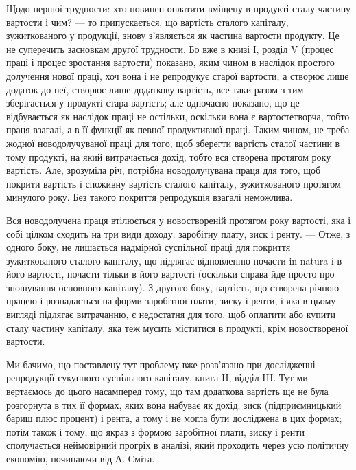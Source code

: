 
Щодо першої трудности: хто повинен оплатити вміщену в продукті сталу
частину вартости і чим? — то припускається, що вартість сталого капіталу, зужиткованого у продукції,
знову з’являється як частина вартости продукту. Це не
суперечить засновкам другої трудности. Бо вже в книзі І, розділ  V (процес праці і
процес зростання вартости) показано, яким чином в наслідок простого долучення
нової праці, хоч вона і не репродукує старої вартости, а створює лише додаток
до неї, створює лише додаткову вартість, все таки разом з тим зберігається
у продукті стара вартість; але одночасно показано, що це відбувається як наслідок
праці не остільки, оскільки вона є вартостетворча, тобто праця взагалі, а в її
функції як певної продуктивної праці. Таким чином, не треба жодної новодолучуваної
праці для того, щоб зберегти вартість сталої частини в тому продукті,
на який витрачається дохід, тобто вся створена протягом року вартість. Але,
зрозуміла річ, потрібна новодолучувана праця для того, щоб покрити вартість
і споживну вартість сталого капіталу, зужиткованого протягом минулого
року. Без такого покриття репродукція взагалі неможлива.

Вся новодолучена праця втілюється у новоствореній протягом року вартості,
яка і собі цілком сходить на три види доходу: заробітну плату,
зиск і ренту. — Отже, з одного боку, не лишається надмірної суспільної праці
для покриття зужиткованого сталого капіталу, що підлягає відновленню почасти
in natura і в його вартості, почасти тільки в його вартості (оскільки справа
йде просто про зношування основного капіталу). З другого боку, вартість, що
створена річною працею і розпадається на форми заробітної плати, зиску і ренти,
і яка в цьому вигляді підлягає витрачанню, є недостатня для того, щоб оплатити
або купити сталу частину капіталу, яка теж мусить міститися в продукті,
крім новоствореної вартости.

Ми бачимо, що поставлену тут проблему вже розв’язано при дослідженні
репродукції сукупного суспільного капіталу, книга II, відділ III. Тут ми вертаємось
до цього насамперед тому, що там додаткова вартість ще не була розгорнута
в тих її формах, яких вона набуває як дохід: зиск (підприємницький
бариш плюс процент) і рента, а тому і не могла бути досліджена в цих формах; потім також і тому, що
якраз з формою заробітної плати, зиску і ренти
сполучається неймовірний прогріх в аналізі, який проходить через усю політичну
економію, починаючи від А. Сміта.

